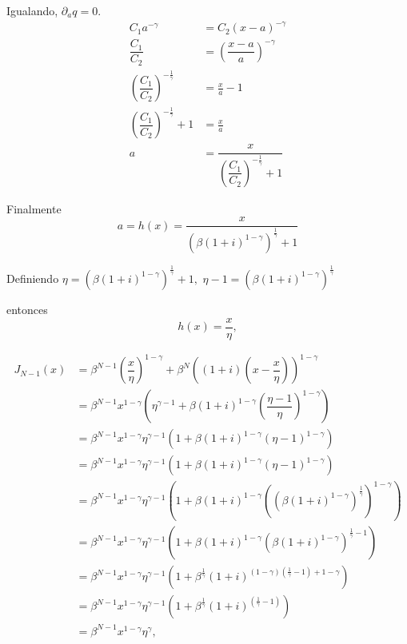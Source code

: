 \documentclass[oneside,spanish]{amsbook}
\numberwithin{section}{chapter}
\numberwithin{equation}{section}
\numberwithin{figure}{section}
\begin{document}
Igualando, $\partial_{a}q=0$. 
\begin{align*}
C_{1}a^{-\gamma} & =C_{2}\left(x-a\right)^{-\gamma}\\
\dfrac{C_{1}}{C_{2}} & =\left(\dfrac{x-a}{a}\right)^{-\gamma}\\
\left(\dfrac{C_{1}}{C_{2}}\right)^{-\frac{1}{\gamma}} & =\frac{x}{a}-1\\
\left(\dfrac{C_{1}}{C_{2}}\right)^{-\frac{1}{\gamma}}+1 & =\frac{x}{a}\\
a & =\dfrac{x}{\left(\dfrac{C_{1}}{C_{2}}\right)^{-\frac{1}{\gamma}}+1}
\end{align*}

Finalmente 
\[
a=h(x)=\dfrac{x}{\left(\beta(1+i)^{1-\gamma}\right)^{\frac{1}{\gamma}}+1}
\]

Definiendo $\eta=\left(\beta(1+i)^{1-\gamma}\right)^{\frac{1}{\gamma}}+1,$
$\eta-1=\left(\beta(1+i)^{1-\gamma}\right)^{\frac{1}{\gamma}}$

entonces 
\[
h(x)=\dfrac{x}{\eta},
\]

\begin{align*}
J_{N-1}(x) & =\beta^{N-1}\left(\dfrac{x}{\eta}\right)^{1-\gamma}+\beta^{N}\left((1+i)\left(x-\dfrac{x}{\eta}\right)\right)^{1-\gamma}\\
 & =\beta^{N-1}x^{1-\gamma}\left(\eta^{\gamma-1}+\beta\left(1+i\right)^{1-\gamma}\left(\dfrac{\eta-1}{\eta}\right)^{1-\gamma}\right)\\
 & =\beta^{N-1}x^{1-\gamma}\eta^{\gamma-1}\left(1+\beta\left(1+i\right)^{1-\gamma}\left(\eta-1\right)^{1-\gamma}\right)\\
 & =\beta^{N-1}x^{1-\gamma}\eta^{\gamma-1}\left(1+\beta\left(1+i\right)^{1-\gamma}\left(\eta-1\right)^{1-\gamma}\right)\\
 & =\beta^{N-1}x^{1-\gamma}\eta^{\gamma-1}\left(1+\beta\left(1+i\right)^{1-\gamma}\left(\left(\beta(1+i)^{1-\gamma}\right)^{\frac{1}{\gamma}}\right)^{1-\gamma}\right)\\
 & =\beta^{N-1}x^{1-\gamma}\eta^{\gamma-1}\left(1+\beta\left(1+i\right)^{1-\gamma}\left(\beta(1+i)^{1-\gamma}\right)^{\frac{1}{\gamma}-1}\right)\\
 & =\beta^{N-1}x^{1-\gamma}\eta^{\gamma-1}\left(1+\beta^{\frac{1}{\gamma}}(1+i)^{\left(1-\gamma\right)\left(\frac{1}{\gamma}-1\right)+1-\gamma}\right)\\
 & =\beta^{N-1}x^{1-\gamma}\eta^{\gamma-1}\left(1+\beta^{\frac{1}{\gamma}}(1+i)^{\left(\frac{1}{\gamma}-1\right)}\right)\\
 & =\beta^{N-1}x^{1-\gamma}\eta^{\gamma},
\end{align*}
\end{document}
